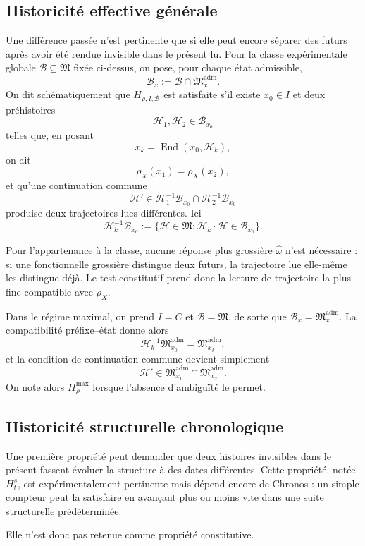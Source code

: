 \documentclass[11pt,a4paper]{article}
\theoremstyle{definition}
\theoremstyle{remark}
\newcommand{\M}{\mathfrak M}
\newcommand{\Madm}{\mathfrak M^{\mathrm{adm}}}
\newcommand{\End}{\operatorname{End}}
\begin{document}
\subsection{Historicité effective générale}

Une différence passée n'est pertinente que si elle peut encore séparer des futurs après avoir été rendue invisible dans le présent lu. Pour la classe expérimentale globale $\mathcal B\subseteq\M$ fixée ci-dessus, on pose, pour chaque état admissible,
\[
\boxed{\mathcal B_x:=\mathcal B\cap\Madm_x.}
\]
On dit schématiquement que $H_{\rho,I,\mathcal B}$ est satisfaite s'il existe $x_0\in I$ et deux préhistoires
\[
\mathcal H_1,\mathcal H_2\in\mathcal B_{x_0}
\]
telles que, en posant
\[
x_k=\End(x_0,\mathcal H_k),
\]
on ait
\[
\rho_X(x_1)=\rho_X(x_2),
\]
et qu'une continuation commune
\[
\boxed{
\mathcal H'\in
\mathcal H_1^{-1}\mathcal B_{x_0}\cap
\mathcal H_2^{-1}\mathcal B_{x_0}}
\]
produise deux trajectoires lues différentes. Ici
\[
\mathcal H_k^{-1}\mathcal B_{x_0}
:=\{\mathcal H\in\M:\mathcal H_k\cdot\mathcal H\in\mathcal B_{x_0}\}.
\]

Pour l'appartenance à la classe, aucune réponse plus grossière $\widehat\omega$ n'est nécessaire : si une fonctionnelle grossière distingue deux futurs, la trajectoire lue elle-même les distingue déjà. Le test constitutif prend donc la lecture de trajectoire la plus fine compatible avec $\rho_X$.

Dans le régime maximal, on prend $I=C$ et $\mathcal B=\M$, de sorte que $\mathcal B_x=\Madm_x$. La compatibilité préfixe--état donne alors
\[
\mathcal H_k^{-1}\Madm_{x_0}=\Madm_{x_k},
\]
et la condition de continuation commune devient simplement
\[
\boxed{\mathcal H'\in\Madm_{x_1}\cap\Madm_{x_2}.}
\]
On note alors $H_\rho^{\max}$ lorsque l'absence d'ambiguïté le permet.

\subsection{Historicité structurelle chronologique}

Une première propriété peut demander que deux histoires invisibles dans le présent fassent évoluer la structure à des dates différentes. Cette propriété, notée $H_t^s$, est expérimentalement pertinente mais dépend encore de Chronos : un simple compteur peut la satisfaire en avançant plus ou moins vite dans une suite structurelle prédéterminée.

Elle n'est donc pas retenue comme propriété constitutive.
\end{document}
